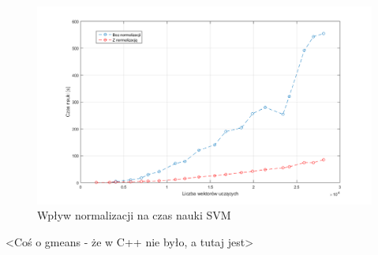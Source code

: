 \begin{figure}[!htp]
	\centering
	\includegraphics[width=16cm]{Grafika/SVMTrain}
	\caption{Wpływ normalizacji na czas nauki SVM}
	\label{fig:TrainNormSVM}
\end{figure}

<Coś o gmeans - że w C++ nie było, a tutaj jest>


